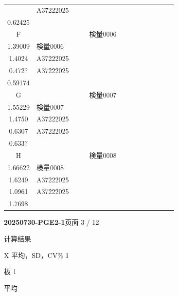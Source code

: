 \documentclass[UTF8,10pt,a4paper,fontset=fandol]{ctexart}
\begin{document}
\begin{tabularx}{\textwidth}{c|*{12}{>{\centering\arraybackslash}X}}
&
\scriptsize A37222025\\[-2pt]\scriptsize 0.62425
& & & & & \\ \hline
F
& & & &
\scriptsize 検量0006\\[-2pt]\scriptsize 1.39009
&
\scriptsize 検量0006\\[-2pt]\scriptsize 1.4024
&
\scriptsize A37222025\\[-2pt]\scriptsize 0.472? 
&
\scriptsize A37222025\\[-2pt]\scriptsize 0.59174
& & & & & \\ \hline
G
& & & &
\scriptsize 検量0007\\[-2pt]\scriptsize 1.55229
&
\scriptsize 検量0007\\[-2pt]\scriptsize 1.4750
&
\scriptsize A37222025\\[-2pt]\scriptsize 0.6307
&
\scriptsize A37222025\\[-2pt]\scriptsize 0.633? 
& & & & & \\ \hline
H
& & & &
\scriptsize 検量0008\\[-2pt]\scriptsize 1.66622
&
\scriptsize 検量0008\\[-2pt]\scriptsize 1.6249
&
\scriptsize A37222025\\[-2pt]\scriptsize 1.0961
&
\scriptsize A37222025\\[-2pt]\scriptsize 1.7698
& & & & & \\ \hline
\end{tabularx}

\normalsize


\newpage

\begin{center}
\textbf{20250730-PGE2-1}\hfill 页面 3 / 12

\medskip
计算结果

X 平均，SD，CV\% 1

\medskip
板 1

平均
\end{center}
\end{document}
